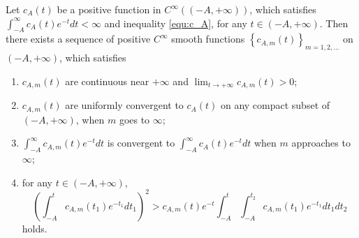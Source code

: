 \begin{lemma}
   Let $c_A(t)$ be a positive function in $C^{\infty}((-A,+\infty))$, which satisfies $\int_{-A}^{\infty} c_A(t) e^{-t} d t<\infty$ and inequality \eqref{equ:c_A}, for any $t \in(-A,+\infty)$. Then there exists a sequence of positive $C^{\infty}$ smooth functions $\left\{c_{A, m}(t)\right\}_{m=1,2, \ldots}$ on $(-A,+\infty)$, which satisfies
   \begin{enumerate}[label=(\roman*),font=\upshape]
    \item $c_{A, m}(t)$ are continuous near $+\infty$ and $\lim _{t \rightarrow+\infty} c_{A, m}(t)>0$;
    \item $c_{A, m}(t)$ are uniformly convergent to $c_A(t)$ on any compact subset of $(-A,+\infty)$, when $m$ goes to $\infty$;
    \item $\int_{-A}^{\infty} c_{A, m}(t) e^{-t} d t$ is convergent to $\int_{-A}^{\infty} c_A(t) e^{-t} d t$ when $m$ approaches to $\infty$;
    \item for any $t \in(-A,+\infty)$,
$$
\left(\int_{-A}^t c_{A, m}\left(t_1\right) e^{-t_1} d t_1\right)^2>c_{A, m}(t) e^{-t} \int_{-A}^t \int_{-A}^{t_2} c_{A, m}\left(t_1\right) e^{-t_1} d t_1 d t_2
$$
holds.
   \end{enumerate}

\end{lemma}

